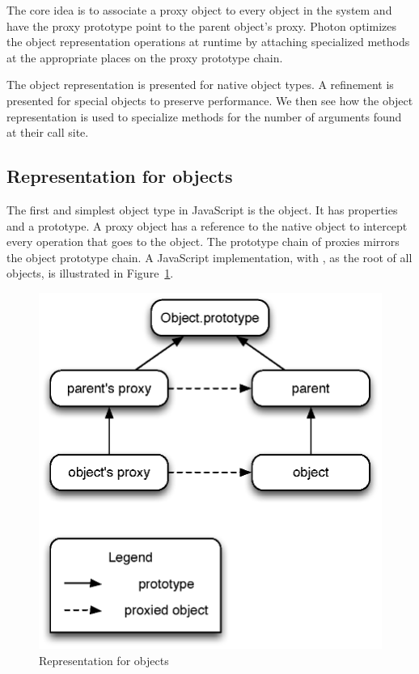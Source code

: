 The core idea is to associate a proxy object to every object in the system and
have the proxy prototype point to the parent object's proxy. Photon optimizes
the object representation operations at runtime by attaching specialized
methods at the appropriate places on the proxy prototype chain.

The object representation is presented for native object types. A refinement is
presented for special objects to preserve performance. We then see how the
object representation is used to specialize methods for the number of arguments
found at their call site. 

\subsection{Representation for objects}

The first and simplest object type in JavaScript is the object. It has
properties and a prototype. A proxy object has a reference to the native object
to intercept every operation that goes to the object. The prototype chain of
proxies mirrors the object prototype chain. A JavaScript implementation, with
, as the root of all objects, is illustrated in
Figure~\ref{fig:BasicRepresentation}.

\begin{figure}[htb]
\begin{center}
\includegraphics[scale=0.75]{figures/objectRepresentation}
\caption{\label{fig:BasicRepresentation} Representation for objects}
\end{center}
\end{figure}


